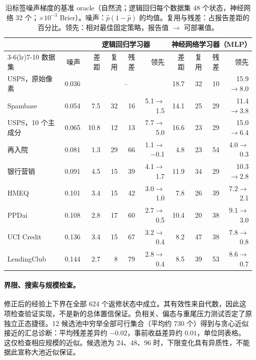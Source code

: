 \documentclass[runningheads]{llncs}
\begin{document}
\begin{table}[t]
\caption{沿标签噪声梯度的基准 oracle（自然流；逻辑回归每个数据集 48 个状态，神经网络 32 个；$\times10^{-3}$ Brier）。噪声：$\hat p(1-\hat p)$ 的均值。复用与残差：占报告差距的百分比。领先：相对最佳固定策略，报告值 $\to$ 可部署值。}
\label{tab:gradient}
\centering\scriptsize
\setlength{\tabcolsep}{2.6pt}
\begin{tabular}{lrrrrrrrrr}
\toprule
& & \multicolumn{4}{c}{逻辑回归学习器} & \multicolumn{4}{c}{神经网络学习器（MLP）} \\
\cmidrule(lr){3-6}\cmidrule(lr){7-10}
数据集 & 噪声 & 差距 & 复用 & 残差 & 领先 & 差距 & 复用 & 残差 & 领先 \\
\midrule
USPS，原始像素 & 0.036 & \multicolumn{4}{c}{--} & 18.7 & 32 & 10 & 15.9$\to$8.0 \\
Spambase & 0.054 & 7.5 & 32 & 16 & 5.1$\to$1.5 & 14.1 & 25 & 29 & 11.4$\to$3.8 \\
USPS，10 个主成分 & 0.065 & 10.8 & 12 & 13 & 7.7$\to$5.0 & 16.6 & 23 & 29 & 15.0$\to$6.4 \\
再入院 & 0.081 & 1.3 & 29 & 66 & 1.1$\to$$-$0.1 & 4.8 & 23 & 54 & 4.0$\to$0.3 \\
银行营销 & 0.091 & 4.5 & 15 & 39 & 4.1$\to$1.7 & 11.9 & 34 & 29 & 10.3$\to$2.8 \\
HMEQ & 0.101 & 3.4 & 15 & 42 & 3.0$\to$1.0 & 7.8 & 26 & 39 & 7.2$\to$2.1 \\
PPDai & 0.108 & 2.8 & 17 & 60 & 2.7$\to$0.5 & 10.4 & 20 & 38 & 9.1$\to$3.0 \\
UCI Credit & 0.136 & 3.4 & 15 & 67 & 3.2$\to$0.4 & 8.2 & 47 & 38 & 7.8$\to$0.8 \\
LendingClub & 0.144 & 2.7 & 8 & 79 & 2.8$\to$0.4 & 8.5 & 39 & 53 & 8.6$\to$0.7 \\
\bottomrule
\end{tabular}
\end{table}

\paragraph{界限、搜索与规模检查。}修正后的经验上下界在全部 624 个返修状态中成立。其有效性来自代数，因此这项检查验证实现，不是新的总体置信保证。负相关、偏态与重尾压力测试否定了原独立正态捷径。12 候选池中穷举全部可行集合（平均约 730 个）得到与贪心近似接近的汇总诊断：平均残差差异约 $-0.02$，事前收益差异约 $0.01$，单位同表格。这仅检查相应规模的近似。候选池为 24、48、96 时，下限变化具有异质性，不能据此宣称大池近似保证。
\end{document}
